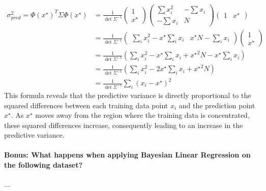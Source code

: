 \begin{align*}
    \sigma^2_{pred} = \Phi (x^\star ) ^T \Sigma \Phi (x^\star ) &= \frac{1}{\det \Sigma^{-1}} \begin{pmatrix}
        1 \\
        x^\star 
    \end{pmatrix} \begin{pmatrix}
        \sum x_i^2 & - \sum x_i \\
        - \sum x_i & N
    \end{pmatrix}\begin{pmatrix}
        1 & x^\star 
    \end{pmatrix} \\
    &= \frac{1}{\det \Sigma^{-1}} \begin{pmatrix}\sum_i x_i^2 - x^\star \sum_i x_i & x^\star N - \sum_i x_i\end{pmatrix} \begin{pmatrix}1 \\ x^\star \end{pmatrix} \\
    &= \frac{1}{\det \Sigma^{-1}}\left(\sum_i x_i^2 - x^\star \sum_i x_i + {x^\star }^2 N - x^\star \sum_i x_i\right) \\
    &= \frac{1}{\det \Sigma^{-1}}\left(\sum_i x_i^2 - 2 x^\star \sum_i x_i + {x^\star }^2 N\right) \\
    &= \frac{1}{\det \Sigma^{-1}}\sum_i \left(x_i - x^\star \right)^2
\end{align*}
This formula reveals that the predictive variance is directly proportional to the squared differences between each training data point \(x_i\) and the prediction point \(x^\star\). As \(x^\star\) moves away from the region where the training data is concentrated, these squared differences increase, consequently leading to an increase in the predictive variance.

\paragraph*{Bonus: What happens when applying Bayesian Linear Regression on the following dataset?}

...

